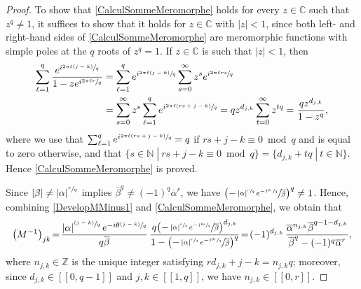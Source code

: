 \documentclass[10pt]{amsart}
\newcommand{\psfrac}[2]{\sfrac{(#1)}{#2}}
\newcommand{\llbracket}{[\![}
\newcommand{\rrbracket}{]\!]}
\theoremstyle{plain}
\theoremstyle{definition}
\newcommand{\suchthat}{\;|\:}
\newcommand{\abs}[1]{\left\lvert #1\right \rvert}
\begin{document}
\begin{proof}
To show that \eqref{CalculSommeMeromorphe} holds for every $z \in \mathbb C$ such that $z^q \neq 1$, it suffices to show that it holds for $z \in \mathbb C$ with $\abs{z} < 1$, since both left- and right-hand sides of \eqref{CalculSommeMeromorphe} are meromorphic functions with simple poles at the $q$ roots of $z^q = 1$. If $z \in \mathbb C$ is such that $\abs{z} < 1$, then\vspace*{-3pt}
\begin{align*}
\sum_{\ell=1}^q \frac{e^{i \sfrac{2\pi \ell (j - k)}{q}}}{1 - z e^{i \sfrac{2 \pi \ell r}{q}}} &= \sum_{\ell=1}^q e^{i \sfrac{2\pi \ell (j - k)}{q}} \sum_{s=0}^\infty z^s e^{i \sfrac{2 \pi \ell r s}{q}}\\
&= \sum_{s=0}^\infty z^s \sum_{\ell=1}^q e^{i \sfrac{2\pi \ell (r s + j - k)}{q}} = q z^{d_{j, k}} \sum_{t = 0}^\infty z^{t q} = \frac{q z^{d_{j, k}}}{1 - z^q},
\end{align*}
where we use that $\sum_{\ell=1}^q e^{i \sfrac{2\pi \ell (r s + j - k)}{q}} = q$ if $r s + j - k \equiv 0 \bmod q$ and is equal to zero otherwise, and that $\{s \in \mathbb N \suchthat r s + j - k \equiv 0 \bmod q\} = \{d_{j, k} + t q \suchthat t \in \mathbb N\}$. Hence \eqref{CalculSommeMeromorphe} is proved.

Since $\abs{\beta} \neq \abs{\alpha}^{\sfrac{r}{q}}$ implies $\overline\beta^q \neq (-1)^q \overline\alpha^r$, we have $\bigl(-\sfrac{\abs{\alpha}^{\sfrac{r}{q}} e^{-i\sfrac{\theta r}{q}}}{\overline\beta}\bigr)^q \neq 1$. Hence, combining \eqref{DevelopMMinus1} and \eqref{CalculSommeMeromorphe}, we obtain that\vspace*{-3pt}
\[
\left(M^{-1}\right)_{jk} \!=\! \frac{\abs{\alpha}^{\psfrac{j-k}{q}} e^{-i\theta\psfrac{j-k}{q}}}{q \overline\beta}\, \frac{q \bigl(-\sfrac{\abs{\alpha}^{\sfrac{r}{q}} e^{-i\sfrac{\theta r}{q}}}{\overline\beta}\bigr)^{d_{j, k}}}{1 - \bigl(-\sfrac{\abs{\alpha}^{\sfrac{r}{q}} e^{-i\sfrac{\theta r}{q}}}{\overline\beta}\bigr)^q} \!=\! (-1)^{d_{j, k}}\, \frac{\overline\alpha^{n_{j, k}}\overline\beta^{q-1-d_{j,k}}}{\overline\beta^q - (-1)^q \overline\alpha^r},
\]
where $n_{j, k} \in \mathbb Z$ is the unique integer satisfying $r d_{j, k} + j - k = n_{j, k} q$; moreover, since $d_{j, k} \in \llbracket 0, q-1\rrbracket$ and $j, k \in \llbracket 1, q\rrbracket$, we have $n_{j, k} \in \llbracket 0, r\rrbracket$.


\end{proof}
\end{document}
